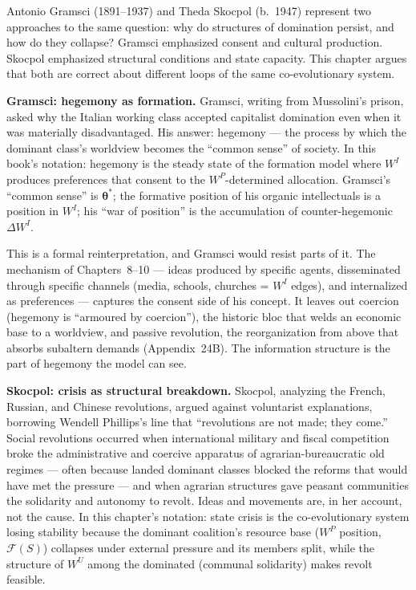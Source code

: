 \documentclass[../structural_economics_book.tex]{subfiles}
\begin{document}
Antonio Gramsci (1891--1937) and Theda Skocpol (b.\ 1947) represent two approaches to the same question: why do structures of domination persist, and how do they collapse? Gramsci emphasized consent and cultural production. Skocpol emphasized structural conditions and state capacity. This chapter argues that both are correct about different loops of the same co-evolutionary system.

\textbf{Gramsci: hegemony as formation.} Gramsci, writing from Mussolini's prison, asked why the Italian working class accepted capitalist domination even when it was materially disadvantaged. His answer: hegemony --- the process by which the dominant class's worldview becomes the ``common sense'' of society. In this book's notation: hegemony is the steady state of the formation model where $W^I$ produces preferences that consent to the $W^P$-determined allocation. Gramsci's ``common sense'' is $\boldsymbol{\theta}^*$; the formative position of his organic intellectuals is a position in $W^I$; his ``war of position'' is the accumulation of counter-hegemonic $\Delta W^I$.

This is a formal reinterpretation, and Gramsci would resist parts of it. The mechanism of Chapters~8--10 --- ideas produced by specific agents, disseminated through specific channels (media, schools, churches = $W^I$ edges), and internalized as preferences --- captures the consent side of his concept. It leaves out coercion (hegemony is ``armoured by coercion''), the historic bloc that welds an economic base to a worldview, and passive revolution, the reorganization from above that absorbs subaltern demands (Appendix~24B). The information structure is the part of hegemony the model can see.

\textbf{Skocpol: crisis as structural breakdown.} Skocpol, analyzing the French, Russian, and Chinese revolutions, argued against voluntarist explanations, borrowing Wendell Phillips's line that ``revolutions are not made; they come.''
 Social revolutions occurred when international military and fiscal competition broke the administrative and coercive apparatus of agrarian-bureaucratic old regimes --- often because landed dominant classes blocked the reforms that would have met the pressure --- and when agrarian structures gave peasant communities the solidarity and autonomy to revolt. Ideas and movements are, in her account, not the cause. In this chapter's notation: state crisis is the co-evolutionary system losing stability because the dominant coalition's resource base ($W^P$ position, $\mathcal{F}(S)$) collapses under external pressure and its members split, while the structure of $W^U$ among the dominated (communal solidarity) makes revolt feasible.
\end{document}
